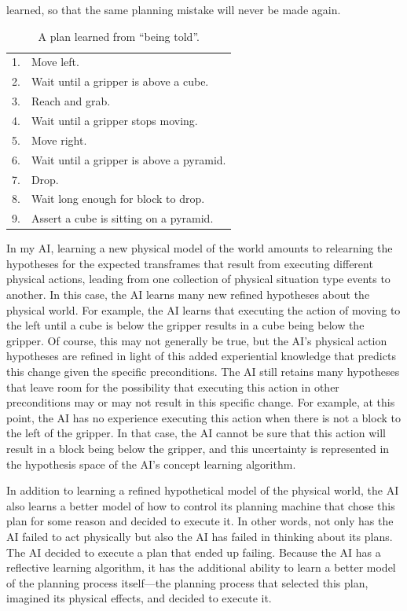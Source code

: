 learned, so that the same planning mistake will never be made again.
\begin{table}
\centering
\begin{tabular}{|rl|}
\hline
 1. & Move left.\\
 2. & Wait until a gripper is above a cube.\\
 3. & Reach and grab.\\
 4. & Wait until a gripper stops moving.\\
 5. & Move right.\\
 6. & Wait until a gripper is above a pyramid.\\
 7. & Drop.\\
 8. & Wait long enough for block to drop.\\
 9. & Assert a cube is sitting on a pyramid.\\
\hline
\end{tabular}
\caption[A plan learned from ``being told''.]{A plan learned from
  ``being told''.}
\label{table:a_plan_learned_from_being_told}
\end{table}
In my AI, learning a new physical model of the world amounts to
relearning the hypotheses for the expected transframes that result
from executing different physical actions, leading from one collection
of physical situation type events to another.  In this case, the AI
learns many new refined hypotheses about the physical world.  For
example, the AI learns that executing the action of moving to the left
until a cube is below the gripper results in a cube being below the
gripper.  Of course, this may not generally be true, but the AI's
physical action hypotheses are refined in light of this added
experiential knowledge that predicts this change given the specific
preconditions.  The AI still retains many hypotheses that leave room
for the possibility that executing this action in other preconditions
may or may not result in this specific change.  For example, at this
point, the AI has no experience executing this action when there is
not a block to the left of the gripper.  In that case, the AI cannot
be sure that this action will result in a block being below the
gripper, and this uncertainty is represented in the hypothesis space
of the AI's concept learning algorithm.

In addition to learning a refined hypothetical model of the physical
world, the AI also learns a better model of how to control its
planning machine that chose this plan for some reason and decided to
execute it.  In other words, not only has the AI failed to act
physically but also the AI has failed in thinking about its plans.
The AI decided to execute a plan that ended up failing.  Because the
AI has a reflective learning algorithm, it has the additional ability
to learn a better model of the planning process itself---the planning
process that selected this plan, imagined its physical effects, and
decided to execute it.

